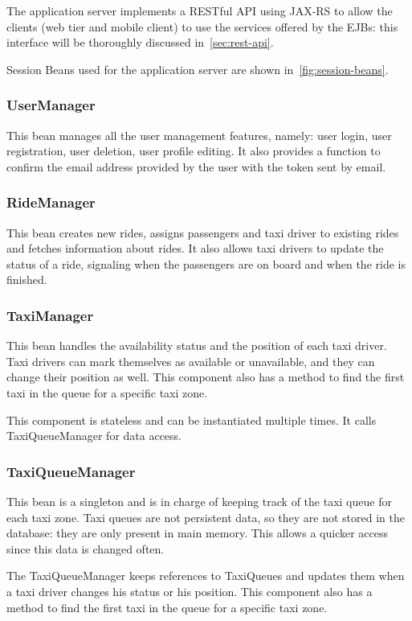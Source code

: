 The application server implements a RESTful API using JAX-RS to allow the clients (web tier and mobile client) to use the services offered by the EJBs: this interface will be thoroughly discussed in~\autoref{sec:rest-api}.

Session Beans used for the application server are shown in~\autoref{fig:session-beans}.

\subsubsection{UserManager}
This bean manages all the user management features, namely: user login, user registration, user deletion, user profile editing.
It also provides a function to confirm the email address provided by the user with the token sent by email.

\subsubsection{RideManager}
This bean creates new rides, assigns passengers and taxi driver to existing rides and fetches information about rides.
It also allows taxi drivers to update the status of a ride, signaling when the passengers are on board and when the ride is finished.

\subsubsection{TaxiManager}
This bean handles the availability status and the position of each taxi driver.
Taxi drivers can mark themselves as available or unavailable, and they can change their position as well.
This component also has a method to find the first taxi in the queue for a specific taxi zone.

This component is stateless and can be instantiated multiple times. It calls TaxiQueueManager for data access.

\subsubsection{TaxiQueueManager}
This bean is a singleton and is in charge of keeping track of the taxi queue for each taxi zone.
Taxi queues are not persistent data, so they are not stored in the database: they are only present in main memory.
This allows a quicker access since this data is changed often.

The TaxiQueueManager keeps references to TaxiQueues and updates them when a taxi driver changes his status or his position.
This component also has a method to find the first taxi in the queue for a specific taxi zone.

